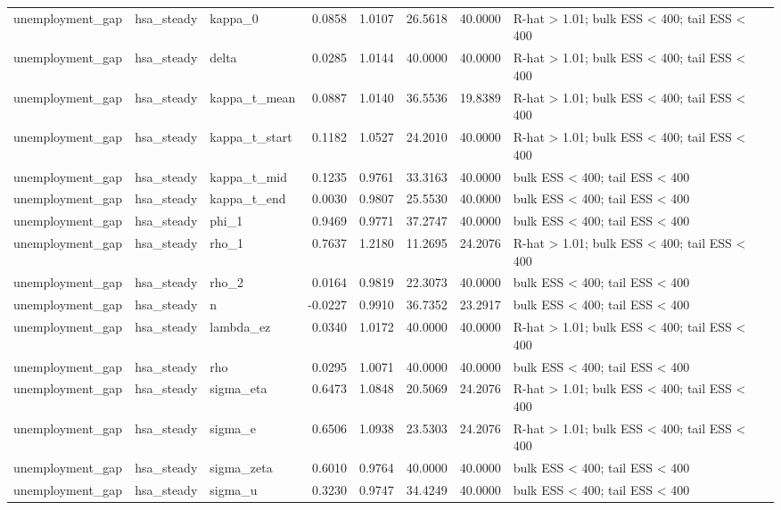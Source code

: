 \begin{tabular}{lllrrrrl}
unemployment\_gap & hsa\_steady & kappa\_0 & 0.0858 & 1.0107 & 26.5618 & 40.0000 & R-hat > 1.01; bulk ESS < 400; tail ESS < 400 \\
unemployment\_gap & hsa\_steady & delta & 0.0285 & 1.0144 & 40.0000 & 40.0000 & R-hat > 1.01; bulk ESS < 400; tail ESS < 400 \\
unemployment\_gap & hsa\_steady & kappa\_t\_mean & 0.0887 & 1.0140 & 36.5536 & 19.8389 & R-hat > 1.01; bulk ESS < 400; tail ESS < 400 \\
unemployment\_gap & hsa\_steady & kappa\_t\_start & 0.1182 & 1.0527 & 24.2010 & 40.0000 & R-hat > 1.01; bulk ESS < 400; tail ESS < 400 \\
unemployment\_gap & hsa\_steady & kappa\_t\_mid & 0.1235 & 0.9761 & 33.3163 & 40.0000 & bulk ESS < 400; tail ESS < 400 \\
unemployment\_gap & hsa\_steady & kappa\_t\_end & 0.0030 & 0.9807 & 25.5530 & 40.0000 & bulk ESS < 400; tail ESS < 400 \\
unemployment\_gap & hsa\_steady & phi\_1 & 0.9469 & 0.9771 & 37.2747 & 40.0000 & bulk ESS < 400; tail ESS < 400 \\
unemployment\_gap & hsa\_steady & rho\_1 & 0.7637 & 1.2180 & 11.2695 & 24.2076 & R-hat > 1.01; bulk ESS < 400; tail ESS < 400 \\
unemployment\_gap & hsa\_steady & rho\_2 & 0.0164 & 0.9819 & 22.3073 & 40.0000 & bulk ESS < 400; tail ESS < 400 \\
unemployment\_gap & hsa\_steady & n & -0.0227 & 0.9910 & 36.7352 & 23.2917 & bulk ESS < 400; tail ESS < 400 \\
unemployment\_gap & hsa\_steady & lambda\_ez & 0.0340 & 1.0172 & 40.0000 & 40.0000 & R-hat > 1.01; bulk ESS < 400; tail ESS < 400 \\
unemployment\_gap & hsa\_steady & rho & 0.0295 & 1.0071 & 40.0000 & 40.0000 & bulk ESS < 400; tail ESS < 400 \\
unemployment\_gap & hsa\_steady & sigma\_eta & 0.6473 & 1.0848 & 20.5069 & 24.2076 & R-hat > 1.01; bulk ESS < 400; tail ESS < 400 \\
unemployment\_gap & hsa\_steady & sigma\_e & 0.6506 & 1.0938 & 23.5303 & 24.2076 & R-hat > 1.01; bulk ESS < 400; tail ESS < 400 \\
unemployment\_gap & hsa\_steady & sigma\_zeta & 0.6010 & 0.9764 & 40.0000 & 40.0000 & bulk ESS < 400; tail ESS < 400 \\
unemployment\_gap & hsa\_steady & sigma\_u & 0.3230 & 0.9747 & 34.4249 & 40.0000 & bulk ESS < 400; tail ESS < 400 \\

\end{tabular}

